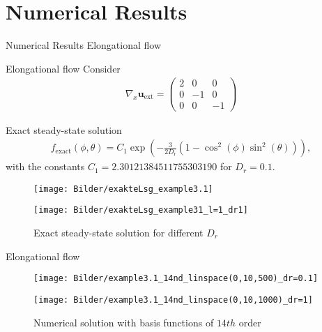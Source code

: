 \section{Numerical Results}

\begin{frame}{Numerical Results}
	\centering
	Elongational flow
\end{frame}


\begin{frame}{Elongational flow}
	\scriptsize
	Consider
	\begin{align*}
		\nabla_{x} \boldsymbol{u}_{\mathrm{ext}}=\left(\begin{array}{ccc}
			2 & 0 & 0 \\
			0 & -1 & 0 \\
			0 & 0 & -1
		\end{array}\right) %
	\end{align*}
	
	Exact steady-state solution
	\begin{align}
		f_{\text {exact}}(\phi, \theta)=C_1 \exp \left(-\frac{3}{2 D_{\mathrm{r}}}\left(1-\cos ^2(\phi) \sin ^2(\theta)\right)\right),
	\end{align}
	with the constants $C_1 = 2.30121384511755303190$ for $D_r=0.1$.
	
	\begin{figure}
		\begin{minipage}{0.4\textwidth}
			\texttt{[image: Bilder/exakteLsg\_example3.1]}
		\end{minipage}
		\hfill 
		\begin{minipage}{0.4\textwidth}
			\texttt{[image: Bilder/exakteLsg\_example31\_l=1\_dr1]}
		\end{minipage}
		\caption{Exact steady-state solution for different $D_r$}
	\end{figure}
\end{frame}



\begin{frame}{Elongational flow}
	\begin{figure}
		\begin{minipage}{0.48\textwidth}
			\texttt{[image: Bilder/example3.1\_14nd\_linspace(0,10,500)\_dr=0.1]}
		\end{minipage}
		\hfill 
		\begin{minipage}{0.48\textwidth}
			\texttt{[image: Bilder/example3.1\_14nd\_linspace(0,10,1000)\_dr=1]}
		\end{minipage}
		\caption{Numerical solution with basis functions of $14th$ order}
	\end{figure}
\end{frame}

